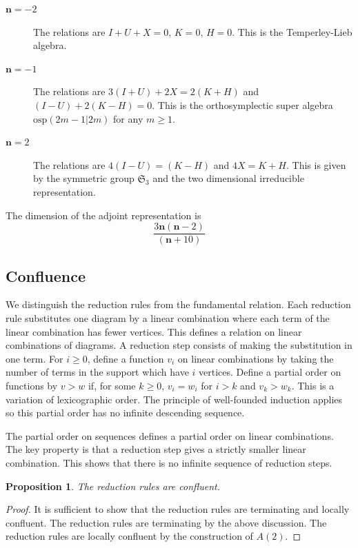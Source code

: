 \documentclass[12pt]{amsart}
\newtheorem{prop}[thm]{Proposition}
\newcommand\fS{\mathfrak{S}}
\newcommand\nn{\mathbf{n}}
\begin{document}
\begin{description}
	\item[$\nn=-2$] The relations are $I+U+X=0$, $K=0$, $H=0$. This is the Temperley-Lieb
	algebra.
	\item[$\nn=-1$] The relations are $3(I+U)+2X = 2(K+H)$ and
	$(I-U) + 2(K-H) =0$. This is the orthosymplectic super algebra $\mathrm{osp}(2m-1|2m)$ for any $m\geqslant 1$.
	\item[$\nn=2$] The relations are $4(I-U)=(K-H)$ and
	$4X=K+H$. This is given by the symmetric group $\fS_3$ and the two dimensional irreducible representation.
\end{description}

The dimension of the adjoint representation is
\[ \frac{3\nn(\nn-2)}{(\nn+10)} \]

\subsection{Confluence}
We distinguish the reduction rules from the fundamental relation. Each reduction rule substitutes one
diagram by a linear combination where each term of the linear combination has fewer vertices. This defines 
a relation on linear combinations of diagrams. A reduction step consists of making the substitution in one term.
For $i\geqslant 0$, define a function $v_i$ on linear combinations by taking the number of terms in the 
support which have $i$ vertices. Define a partial order on functions by $v>w$ if, for some $k\geqslant 0$,
$v_i = w_i$ for $i>k$ and $v_k > w_k$. This is a variation of lexicographic order. The principle
of well-founded induction applies so this partial order has no infinite descending sequence.

The partial order on sequences defines a partial order on linear combinations. The key property is that a
reduction step gives a strictly smaller linear combination. This shows that there is no infinite sequence
of reduction steps.

\begin{prop} The reduction rules are confluent.
\end{prop}

\begin{proof} It is sufficient to show that the reduction rules are terminating and locally confluent.
	The reduction rules are terminating by the above discussion. The reduction rules are locally
	confluent by the construction of $A(2)$.
\end{proof}
\end{document}
